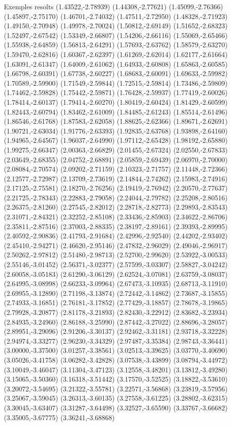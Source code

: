 \documentclass[11pt,a4paper]{article}
\begin{document}
\begin{fmex}{Exemples resolts}
(1.43522,-2.78939) (1.44308,-2.77621) (1.45099,-2.76366) (1.45897,-2.75170) (1.46701,-2.74032) (1.47511,-2.72950) (1.48328,-2.71923) (1.49150,-2.70948) (1.49978,-2.70024) (1.50812,-2.69149) (1.51652,-2.68323) (1.52497,-2.67542) (1.53349,-2.66807) (1.54206,-2.66116) (1.55069,-2.65466) (1.55938,-2.64859) (1.56813,-2.64291) (1.57693,-2.63762) (1.58579,-2.63270) (1.59470,-2.62816) (1.60367,-2.62397) (1.61269,-2.62014) (1.62177,-2.61664) (1.63091,-2.61347) (1.64009,-2.61062) (1.64933,-2.60808) (1.65863,-2.60585) (1.66798,-2.60391) (1.67738,-2.60227) (1.68683,-2.60091) (1.69633,-2.59982) (1.70589,-2.59900) (1.71549,-2.59844) (1.72515,-2.59814) (1.73486,-2.59809) (1.74462,-2.59828) (1.75442,-2.59871) (1.76428,-2.59937) (1.77419,-2.60026) (1.78414,-2.60137) (1.79414,-2.60270) (1.80419,-2.60424) (1.81429,-2.60599) (1.82443,-2.60794) (1.83462,-2.61009) (1.84485,-2.61243) (1.85514,-2.61496) (1.86546,-2.61768) (1.87583,-2.62058) (1.88625,-2.62366) (1.89671,-2.62691) (1.90721,-2.63034) (1.91776,-2.63393) (1.92835,-2.63768) (1.93898,-2.64160) (1.94965,-2.64567) (1.96037,-2.64990) (1.97112,-2.65428) (1.98192,-2.65880) (1.99275,-2.66347) (2.00363,-2.66829) (2.01455,-2.67324) (2.02550,-2.67833) (2.03649,-2.68355) (2.04752,-2.68891) (2.05859,-2.69439) (2.06970,-2.70000) (2.08084,-2.70574) (2.09202,-2.71159) (2.10323,-2.71757) (2.11448,-2.72366) (2.12577,-2.72987) (2.13709,-2.73619) (2.14844,-2.74262) (2.15983,-2.74916) (2.17125,-2.75581) (2.18270,-2.76256) (2.19419,-2.76942) (2.20570,-2.77637) (2.21725,-2.78343) (2.22883,-2.79058) (2.24044,-2.79782) (2.25208,-2.80516) (2.26375,-2.81260) (2.27545,-2.82012) (2.28718,-2.82773) (2.29893,-2.83543) (2.31071,-2.84321) (2.32252,-2.85108) (2.33436,-2.85903) (2.34622,-2.86706) (2.35811,-2.87516) (2.37003,-2.88335) (2.38197,-2.89161) (2.39393,-2.89995) (2.40592,-2.90836) (2.41793,-2.91684) (2.42996,-2.92540) (2.44202,-2.93402) (2.45410,-2.94271) (2.46620,-2.95146) (2.47832,-2.96029) (2.49046,-2.96917) (2.50262,-2.97812) (2.51480,-2.98713) (2.52700,-2.99620) (2.53922,-3.00533) (2.55146,-3.01452) (2.56371,-3.02377) (2.57599,-3.03307) (2.58827,-3.04242) (2.60058,-3.05183) (2.61290,-3.06129) (2.62524,-3.07081) (2.63759,-3.08037) (2.64995,-3.08998) (2.66233,-3.09964) (2.67473,-3.10935) (2.68713,-3.11910) (2.69955,-3.12890) (2.71198,-3.13874) (2.72442,-3.14862) (2.73687,-3.15855) (2.74933,-3.16851) (2.76181,-3.17852) (2.77429,-3.18857) (2.78678,-3.19865) (2.79928,-3.20877) (2.81178,-3.21893) (2.82430,-3.22912) (2.83682,-3.23934) (2.84935,-3.24960) (2.86188,-3.25990) (2.87442,-3.27022) (2.88696,-3.28057) (2.89951,-3.29096) (2.91206,-3.30137) (2.92462,-3.31181) (2.93718,-3.32228) (2.94974,-3.33277) (2.96230,-3.34329) (2.97487,-3.35384) (2.98743,-3.36441) (3.00000,-3.37500) (3.01257,-3.38561) (3.02513,-3.39625) (3.03770,-3.40690) (3.05026,-3.41758) (3.06282,-3.42828) (3.07538,-3.43899) (3.08794,-3.44972) (3.10049,-3.46047) (3.11304,-3.47123) (3.12558,-3.48201) (3.13812,-3.49280) (3.15065,-3.50360) (3.16318,-3.51442) (3.17570,-3.52525) (3.18822,-3.53610) (3.20072,-3.54695) (3.21322,-3.55781) (3.22571,-3.56868) (3.23819,-3.57956) (3.25067,-3.59045) (3.26313,-3.60135) (3.27558,-3.61225) (3.28802,-3.62315) (3.30045,-3.63407) (3.31287,-3.64498) (3.32527,-3.65590) (3.33767,-3.66682) (3.35005,-3.67775) (3.36241,-3.68868) 
\end{fmex}
\end{document}
